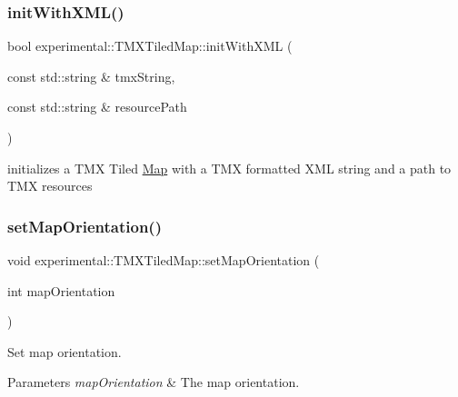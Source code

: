 \subsubsection{\texorpdfstring{init\+With\+X\+M\+L()}{initWithXML()}\hspace{0.1cm}{\footnotesize\ttfamily [2/2]}}
{\footnotesize\ttfamily bool experimental\+::\+T\+M\+X\+Tiled\+Map\+::init\+With\+X\+ML (\begin{DoxyParamCaption}\item[{const std\+::string \&}]{tmx\+String,  }\item[{const std\+::string \&}]{resource\+Path }\end{DoxyParamCaption})\hspace{0.3cm}{\ttfamily [protected]}}

initializes a T\+MX Tiled \hyperlink{classMap}{Map} with a T\+MX formatted X\+ML string and a path to T\+MX resources \mbox{\label{classexperimental_1_1TMXTiledMap_a051a7e04779c8f0bba62dc89dbe154d3}} 
\subsubsection{\texorpdfstring{set\+Map\+Orientation()}{setMapOrientation()}\hspace{0.1cm}{\footnotesize\ttfamily [1/2]}}
{\footnotesize\ttfamily void experimental\+::\+T\+M\+X\+Tiled\+Map\+::set\+Map\+Orientation (\begin{DoxyParamCaption}\item[{int}]{map\+Orientation }\end{DoxyParamCaption})\hspace{0.3cm}{\ttfamily [inline]}}

Set map orientation.


\begin{DoxyParams}{Parameters}
{\em map\+Orientation} & The map orientation. \\
\hline
\end{DoxyParams}
\mbox{\label{classexperimental_1_1TMXTiledMap_a051a7e04779c8f0bba62dc89dbe154d3}} 
